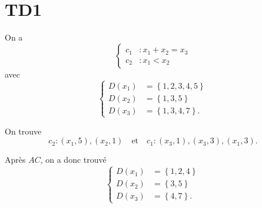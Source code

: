 \section{TD1}


\begin{td-exo}
    On a
    \begin{equation*}
        \begin{cases}
            c_1 &\colon x_1 + x_2 = x_3 \\
            c_2 &\colon x_1 < x_2
        \end{cases}
    \end{equation*}
    avec
    \begin{equation*}
        \begin{cases}
            D(x_1) &= \left\{1, 2, 3, 4, 5\right\} \\
            D(x_2) &= \left\{1, 3, 5\right\} \\
            D(x_3) &= \left\{1, 3, 4, 7\right\}.
        \end{cases}
    \end{equation*}

    On trouve
    \begin{equation*}
        c_2 \colon (x_1, 5), (x_2, 1) \quad\text{et}\quad c_1 \colon (x_3, 1), (x_3, 3), (x_1, 3).
    \end{equation*}

    Après \(AC\), on a donc trouvé
    \begin{equation*}
        \begin{cases}
            D(x_1) &= \left\{1, 2, 4\right\} \\
            D(x_2) &= \left\{3, 5\right\} \\
            D(x_3) &= \left\{4, 7\right\}.
        \end{cases}
    \end{equation*}
\end{td-exo}

